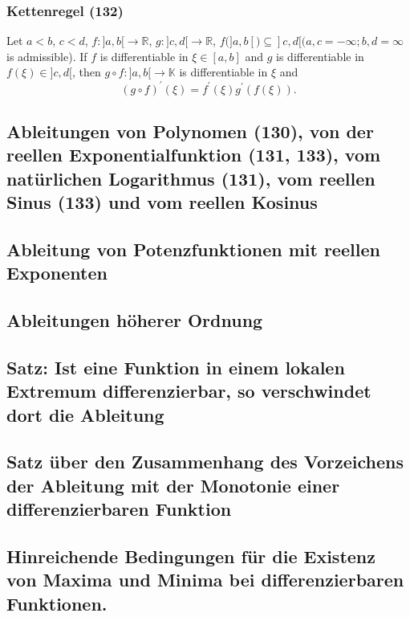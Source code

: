 \subsubsection{Kettenregel (132)}
Let $a < b$, $c < d$, $f : ] a ,b [ \rightarrow \mathbb { R }$, $g : ] c ,d [ \rightarrow \mathbb { R }$, $f ( ] a ,b [ ) \subseteq ] c ,d [ ( a ,c = - \infty ; b ,d = \infty$ is admissible). If $f$ is differentiable in $\xi \in [ a ,b ]$ and $g$ is differentiable in $f(\xi) \in ] c ,d [$, then $g \circ f : ] a ,b [ \rightarrow \mathbb { K }$ is differentiable in $\xi$ and
\begin{equation}
( g \circ f ) ^ { \prime } ( \xi ) = f ^ { \prime } ( \xi ) g ^ { \prime } ( f ( \xi ) ).
\end{equation}

\subsection{Ableitungen von Polynomen (130), von der reellen Exponentialfunktion (131, 133), vom natürlichen Logarithmus (131), vom reellen Sinus (133) und vom reellen Kosinus}
\TODO{!!!}

\subsection{Ableitung von Potenzfunktionen mit reellen Exponenten}
\TODO{!!!}

\subsection{Ableitungen höherer Ordnung} 
\TODO{!!!}

\subsection{Satz: Ist eine Funktion in einem lokalen Extremum differenzierbar, so verschwindet dort die Ableitung}
\TODO{!!!}

\subsection{Satz über den Zusammenhang des Vorzeichens der Ableitung mit der Monotonie einer differenzierbaren Funktion}
\TODO{!!!}

\subsection{Hinreichende Bedingungen für die Existenz von Maxima und Minima bei differenzierbaren Funktionen.}
\TODO{!!!}